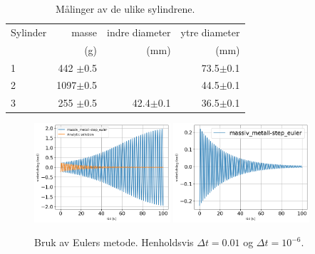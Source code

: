\documentclass[5p]{elsarticle}
\begin{document}
\begin{table}[h!]
	\begin{center}
		\caption{Målinger av de ulike sylindrene.}
		\label{MinLilleTabell}	%
		\begin{tabular}{lrrr} 		%
			\hline 								%
		    Sylinder &  masse  & indre diameter & ytre diameter \\ %
			&  (g)    &   (mm)   &  (mm)    \\ %
			\hline												
			1   &  442 \(\pm\)0.5 & 	  & 73.5\(\pm\)0.1 \\ %
			2   &  1097\(\pm\)0.5 & 	  & 44.5\(\pm\)0.1 \\ %
			3   &  255 \(\pm\)0.5 & 42.4\(\pm\)0.1 & 36.5\(\pm\)0.1 \\ %
			\hline
		\end{tabular}
	\end{center}
\end{table}


\begin{figure}[p] 
	\begin{center}
        	\includegraphics[width=0.45\textwidth]{Plots/Saved-Plots/combined-analytic/massiv_metall-step_euler.png}
        	\includegraphics[width=0.45\textwidth]{Plots/Saved-Plots/step_euler-2b-small_dt/massiv_metall-step_euler-plot.png}
        \end{center}
	\caption{Bruk av Eulers metode. Henholdsvis \(\Delta t = 0.01\) og \(\Delta t = 10^{-6}\).}
	\label{Fig step-Euler} %
\end{figure}
\end{document}
